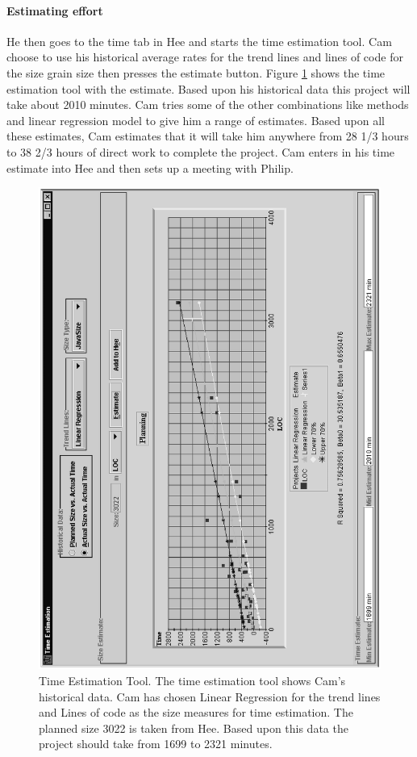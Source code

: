 \paragraph*{Estimating effort}
He then goes to the time tab in Hee and starts the time estimation tool. Cam
choose to use his historical average rates for the trend lines and lines of
code for the size grain size then presses the estimate button. Figure
\ref{fig:timeest1} shows the time estimation tool with the estimate.  Based
upon his historical data this project will take about 2010 minutes.  Cam tries
some of the other combinations like methods and linear regression model to give
him a range of estimates.  Based upon all these estimates, Cam estimates that
it will take him anywhere from 28 1/3 hours to 38 2/3 hours of direct work to
complete the project. Cam enters in his time estimate into Hee and then sets up
a meeting with Philip.
\begin{figure}[htbp]
  \centering
  \includegraphics[angle=270,width=6in,bb=67 58 546 734]{timeest1.ps}
  \caption{Time Estimation Tool. The time estimation tool shows Cam's
    historical data.  Cam has chosen Linear Regression for the trend lines and
    Lines of code as the size measures for time estimation. The planned size
    3022 is taken from Hee.  Based upon this data the project should take from
    1699 to 2321 minutes.}
  \label{fig:timeest1}
\end{figure}


